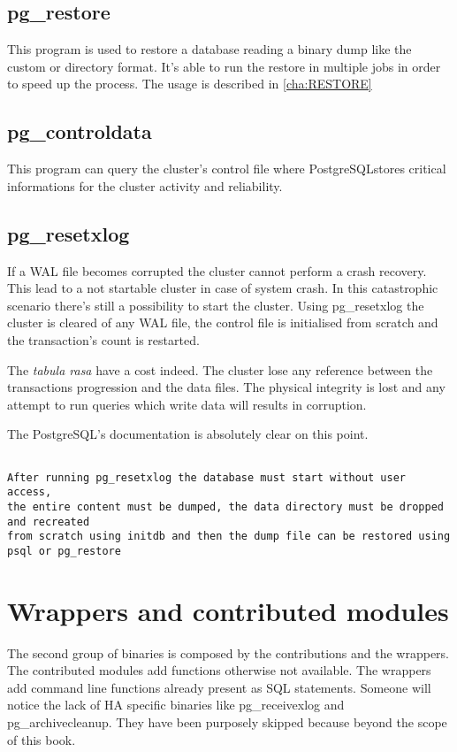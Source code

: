 \subsection{pg\_restore}
This program is used to restore a database reading a binary dump like the custom or directory 
format. It's able to run the restore in multiple jobs in order to speed up the process. The usage 
is described in \ref{cha:RESTORE}

\subsection{pg\_controldata}\label{sub:PGCONTROLDATA}
This program can query the cluster's control file where PostgreSQLstores critical informations for 
the cluster activity and reliability. 

\subsection{pg\_resetxlog}
If a WAL file becomes corrupted the cluster cannot perform a crash recovery. This lead to a not 
startable cluster in case of system crash. In this catastrophic scenario there's still a 
possibility to start the cluster. Using pg\_resetxlog the cluster is cleared of any WAL file, the  
control file is initialised from scratch and the transaction's count is restarted.\newline

The \textit{tabula rasa} have a cost indeed. The cluster lose any reference between the 
transactions progression and the data files. The physical integrity is lost and any attempt to run 
queries which write data will results in corruption.\newline 

The PostgreSQL's documentation is absolutely clear on this point.

\begin{verbatim}

After running pg_resetxlog the database must start without user access, 
the entire content must be dumped, the data directory must be dropped and recreated 
from scratch using initdb and then the dump file can be restored using psql or pg_restore
\end{verbatim}

\section{Wrappers and contributed modules}
The second group of binaries is composed by the contributions and the wrappers. The 
contributed modules add functions otherwise not available. The wrappers add command line 
functions already present as SQL statements. Someone will notice the lack of HA specific binaries 
like pg\_receivexlog and pg\_archivecleanup. They have been purposely skipped because beyond the 
scope of this book.

